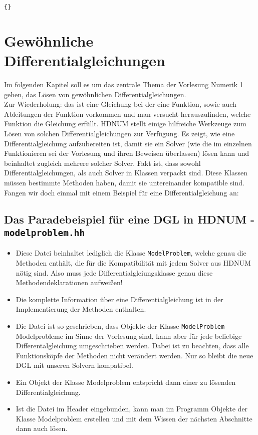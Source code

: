 \documentclass[a4paper,11pt]{article}
\theoremstyle{definition}
\begin{document}
\begin{itemize}
{{\begin{lstlisting}{}
\end{lstlisting}}}
\end{itemize}



\section{Gewöhnliche Differentialgleichungen}
Im folgenden Kapitel soll es um das zentrale Thema der Vorlesung Numerik 1 gehen, das Lösen von gewöhnlichen Differentialgleichungen.\\
Zur Wiederholung: das ist eine Gleichung bei der eine Funktion, sowie auch Ableitungen der Funktion vorkommen und man versucht herauszufinden, welche Funktion die Gleichung erfüllt. HDNUM stellt einige hilfreiche Werkzeuge zum Lösen von solchen Differentialgleichungen zur Verfügung. 
Es zeigt, wie eine Differentialgleichung aufzubereiten ist, damit sie ein Solver (wie die im einzelnen Funktionieren sei der Vorlesung und ihren Beweisen überlassen) lösen kann und beinhaltet zugleich mehrere solcher Solver. Fakt ist, dass sowohl Differentialgleichungen, als auch Solver in Klassen verpackt sind. Diese Klassen müssen bestimmte Methoden haben, damit sie untereinander kompatible sind. Fangen wir doch einmal mit einem Beispiel für eine Differentialgleichung an: 
\subsection{Das Paradebeispiel für eine DGL in HDNUM - \lstinline{modelproblem.hh}}

\begin{itemize}
\item Diese Datei beinhaltet lediglich die Klasse \lstinline{ModelProblem}, welche genau die Methoden enthält, die für die Kompatibilität mit jedem Solver aus HDNUM nötig sind. Also muss jede Differentialgleiungsklasse genau diese Methodendeklarationen aufweißen! 
\item Die komplette Information über eine Differentialgleichung ist in der Implementierung der Methoden enthalten.
\item Die Datei ist so geschrieben, dass Objekte der Klasse \lstinline{ModelProblem} Modelprobleme im Sinne der Vorlesung sind, kann aber für jede beliebige Differentalgleichung umgeschrieben werden. Dabei ist zu beachten, dass alle Funktionsköpfe der Methoden nicht verändert werden. Nur so bleibt die neue DGL mit unseren Solvern kompatibel.
\item Ein Objekt der Klasse Modelproblem entspricht dann einer zu lösenden Differentialgleichung. 
\item Ist die Datei im Header eingebunden, kann man im Programm Objekte der Klasse Modelproblem erstellen und mit dem Wissen der nächsten Abschnitte dann auch lösen.

\end{itemize}
\end{document}
